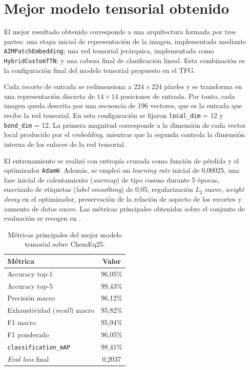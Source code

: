 \section{Mejor modelo tensorial obtenido}

El mejor resultado obtenido corresponde a una arquitectura formada por tres partes: una etapa inicial de representación de la imagen, implementada mediante \texttt{AIMPatchEmbedding}; una red tensorial jerárquica, implementada como \texttt{HybridCustomTTN}; y una cabeza final de clasificación lineal. Esta combinación es la configuración final del modelo tensorial propuesto en el TFG.

Cada recorte de entrada se redimensiona a $224\times224$ píxeles y se transforma en una representación discreta de $14\times14$ posiciones de entrada. Por tanto, cada imagen queda descrita por una secuencia de 196 vectores, que es la entrada que recibe la red tensorial. En esta configuración se fijaron \texttt{local\_dim} = 12 y \texttt{bond\_dim} = 12. La primera magnitud corresponde a la dimensión de cada vector local producido por el \textit{embedding}, mientras que la segunda controla la dimensión interna de los enlaces de la red tensorial.

El entrenamiento se realizó con entropía cruzada como función de pérdida y el optimizador \texttt{AdamW}. Además, se empleó un \textit{learning rate} inicial de 0,00025, una fase inicial de calentamiento (\textit{warmup}) de tipo coseno durante 5 épocas, suavizado de etiquetas (\textit{label smoothing}) de 0,05, regularización $L_2$ suave, \textit{weight decay} en el optimizador, preservación de la relación de aspecto de los recortes y aumento de datos suave. Las métricas principales obtenidas sobre el conjunto de evaluación se recogen en .

\begin{table}[H]
\centering
\small
\begin{tabular}{lc}
\toprule
\textbf{Métrica} & \textbf{Valor} \\
\midrule
Accuracy top-1 & 96,05\% \\
Accuracy top-5 & 99,43\% \\
Precisión macro & 96,12\% \\
Exhaustividad (\textit{recall}) macro & 95,82\% \\
F1 macro & 95,94\% \\
F1 ponderado & 96,05\% \\
\texttt{classification\_mAP} & 98,41\% \\
\textit{Eval loss} final & 0,2037 \\
\bottomrule
\end{tabular}
\caption{Métricas principales del mejor modelo tensorial sobre ChemEq25.}
\label{tab:mejor_modelo}
\end{table}

